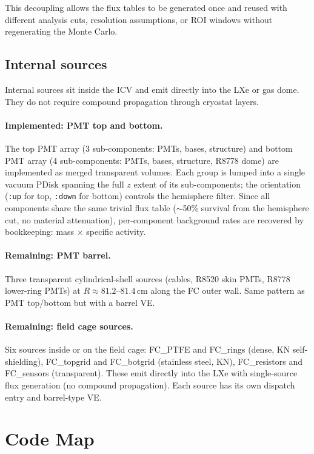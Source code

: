 \documentclass[11pt]{article}
\begin{document}
This decoupling allows the flux tables to be generated once and reused with
different analysis cuts, resolution assumptions, or ROI windows without
regenerating the Monte Carlo.

\subsection{Internal sources}

Internal sources sit inside the ICV and emit directly into the LXe or gas
dome. They do not require compound propagation through cryostat layers.

\paragraph{Implemented: PMT top and bottom.}
The top PMT array (3 sub-components: PMTs, bases, structure) and bottom PMT
array (4 sub-components: PMTs, bases, structure, R8778 dome) are implemented
as merged transparent volumes. Each group is lumped into a single vacuum PDisk
spanning the full $z$ extent of its sub-components; the orientation (\texttt{:up}
for top, \texttt{:down} for bottom) controls the hemisphere filter. Since all
components share the same trivial flux table ($\sim$50\% survival from the
hemisphere cut, no material attenuation), per-component background rates are
recovered by bookkeeping: mass $\times$ specific activity.

\paragraph{Remaining: PMT barrel.}
Three transparent cylindrical-shell sources (cables, R8520 skin PMTs,
R8778 lower-ring PMTs) at $R \approx 81.2$--$81.4$\,cm along the FC outer
wall. Same pattern as PMT top/bottom but with a barrel VE.

\paragraph{Remaining: field cage sources.}
Six sources inside or on the field cage: FC\_PTFE and FC\_rings (dense, KN
self-shielding), FC\_topgrid and FC\_botgrid (stainless steel, KN),
FC\_resistors and FC\_sensors (transparent). These emit directly into the LXe
with single-source flux generation (no compound propagation). Each source has
its own dispatch entry and barrel-type VE.

\section{Code Map}
\end{document}
